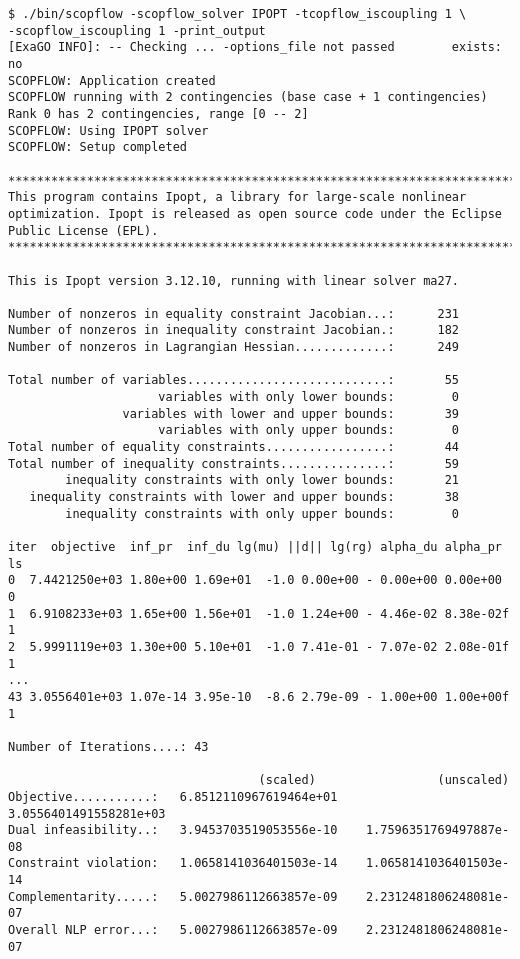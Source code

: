 \begin{lstlisting}
$ ./bin/scopflow -scopflow_solver IPOPT -tcopflow_iscoupling 1 \
-scopflow_iscoupling 1 -print_output
[ExaGO INFO]: -- Checking ... -options_file not passed        exists: no
SCOPFLOW: Application created
SCOPFLOW running with 2 contingencies (base case + 1 contingencies)
Rank 0 has 2 contingencies, range [0 -- 2]
SCOPFLOW: Using IPOPT solver
SCOPFLOW: Setup completed

*************************************************************************
This program contains Ipopt, a library for large-scale nonlinear 
optimization. Ipopt is released as open source code under the Eclipse 
Public License (EPL).
*************************************************************************

This is Ipopt version 3.12.10, running with linear solver ma27.

Number of nonzeros in equality constraint Jacobian...:      231
Number of nonzeros in inequality constraint Jacobian.:      182
Number of nonzeros in Lagrangian Hessian.............:      249

Total number of variables............................:       55
                     variables with only lower bounds:        0
                variables with lower and upper bounds:       39
                     variables with only upper bounds:        0
Total number of equality constraints.................:       44
Total number of inequality constraints...............:       59
        inequality constraints with only lower bounds:       21
   inequality constraints with lower and upper bounds:       38
        inequality constraints with only upper bounds:        0

iter  objective  inf_pr  inf_du lg(mu) ||d|| lg(rg) alpha_du alpha_pr  ls
0  7.4421250e+03 1.80e+00 1.69e+01  -1.0 0.00e+00 - 0.00e+00 0.00e+00   0
1  6.9108233e+03 1.65e+00 1.56e+01  -1.0 1.24e+00 - 4.46e-02 8.38e-02f  1
2  5.9991119e+03 1.30e+00 5.10e+01  -1.0 7.41e-01 - 7.07e-02 2.08e-01f  1
...
43 3.0556401e+03 1.07e-14 3.95e-10  -8.6 2.79e-09 - 1.00e+00 1.00e+00f  1

Number of Iterations....: 43

                                   (scaled)                 (unscaled)
Objective...........:   6.8512110967619464e+01    3.0556401491558281e+03
Dual infeasibility..:   3.9453703519053556e-10    1.7596351769497887e-08
Constraint violation:   1.0658141036401503e-14    1.0658141036401503e-14
Complementarity.....:   5.0027986112663857e-09    2.2312481806248081e-07
Overall NLP error...:   5.0027986112663857e-09    2.2312481806248081e-07



\end{lstlisting}
